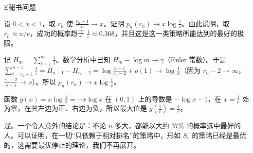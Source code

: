 \begin{probleme}{E}{秘书问题}
\begin{questions}
\item 设 $0<x<1$，取 $r_n$ 使 $\frac{r_n-1}n\to x$。证明 $p_n(r_n)\to x\log\frac1x$。由此说明，取 $r_n\approx n/e$，成功的概率趋于 $\frac1e\approx0.368$，并且这是这一类策略所能达到的最好的极限。
\begin{solution}
记 $H_m=\sum_{i=1}^m\frac1i$。数学分析中已知 $H_m-\log m\to\gamma$（Euler 常数）。于是 $\sum_{i=r_n-1}^{n-1}\frac1i=H_{n-1}-H_{r_n-2}=\log\frac{n-1}{r_n-2}+o(1)\to\log\frac1x$（因为 $r_n-2\to\infty$，$\frac{r_n-2}{n-1}\to x$）。所以 $p_n(r_n)\to x\log\frac1x$。

函数 $g(x)=x\log\frac1x=-x\log x$ 在 $(0,1)$ 上的导数是 $-\log x-1$，在 $x=\frac1e$ 处为零，在其左边为正、右边为负，所以最大值是 $g(\frac1e)=\frac1e$。

\emph{注。}一个令人意外的结论是：不论 $n$ 多大，都能以大约 $37\%$ 的概率选中最好的人。可以证明，在一切“只依赖于相对排名”的策略中，形如 $S_r$ 的策略已经是最优的，这需要最优停止的理论，我们不再展开。
\end{solution}
\end{questions}
\end{probleme}

